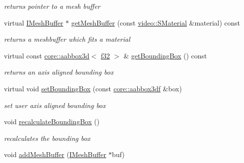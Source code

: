 \begin{DoxyCompactItemize}
\begin{DoxyCompactList}\small\item\em returns pointer to a mesh buffer \end{DoxyCompactList}\item 
virtual \hyperlink{classirr_1_1scene_1_1IMeshBuffer}{I\+Mesh\+Buffer} $\ast$ \hyperlink{structirr_1_1scene_1_1SMesh_a768eeba9148e949d6962bee08517a056}{get\+Mesh\+Buffer} (const \hyperlink{classirr_1_1video_1_1SMaterial}{video\+::\+S\+Material} \&material) const
\begin{DoxyCompactList}\small\item\em returns a meshbuffer which fits a material \end{DoxyCompactList}\item 
\mbox{\label{structirr_1_1scene_1_1SMesh_a379e330c863acdade37e65275903158d}} 
virtual const \hyperlink{classirr_1_1core_1_1aabbox3d}{core\+::aabbox3d}$<$ \hyperlink{namespaceirr_a0277be98d67dc26ff93b1a6a1d086b07}{f32} $>$ \& \hyperlink{structirr_1_1scene_1_1SMesh_a379e330c863acdade37e65275903158d}{get\+Bounding\+Box} () const
\begin{DoxyCompactList}\small\item\em returns an axis aligned bounding box \end{DoxyCompactList}\item 
\mbox{\label{structirr_1_1scene_1_1SMesh_a636e4df4054b2ed2911808cfb6df5cb3}} 
virtual void \hyperlink{structirr_1_1scene_1_1SMesh_a636e4df4054b2ed2911808cfb6df5cb3}{set\+Bounding\+Box} (const \hyperlink{namespaceirr_1_1core_a60f4b4c744aba55f10530d503c6ecb04}{core\+::aabbox3df} \&box)
\begin{DoxyCompactList}\small\item\em set user axis aligned bounding box \end{DoxyCompactList}\item 
\mbox{\label{structirr_1_1scene_1_1SMesh_a7a16bc83094ab242ae779baf817dc7f9}} 
void \hyperlink{structirr_1_1scene_1_1SMesh_a7a16bc83094ab242ae779baf817dc7f9}{recalculate\+Bounding\+Box} ()
\begin{DoxyCompactList}\small\item\em recalculates the bounding box \end{DoxyCompactList}\item 
void \hyperlink{structirr_1_1scene_1_1SMesh_a890e7506262b2ebaf45ff95c681452bd}{add\+Mesh\+Buffer} (\hyperlink{classirr_1_1scene_1_1IMeshBuffer}{I\+Mesh\+Buffer} $\ast$buf)

\end{DoxyCompactItemize}
